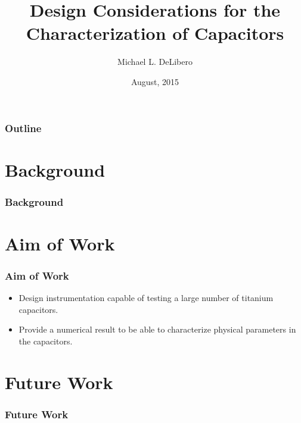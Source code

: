 \documentclass{beamer}
\title{Design Considerations for the Characterization of Capacitors}
\author{Michael L. DeLibero}
\date{August, 2015}
\institute[CWRU]{Case Western Reserve University}
\begin{document}
\begin{frame}
    \titlepage
\end{frame}



\begin{frame}
  \frametitle{Outline}
  \tableofcontents
\end{frame}

\section{Background}
\begin{frame}
    \frametitle{Background}
\end{frame}

\section{Aim of Work}
\begin{frame}
    \frametitle{Aim of Work}
    \begin{itemize}
        \item Design instrumentation capable of testing a large number of titanium capacitors.
        \item Provide a numerical result to be able to characterize physical parameters in the capacitors.
    \end{itemize}
\end{frame}




\section{Future Work}
\begin{frame}
    \frametitle{Future Work}
    
\end{frame}


\end{document}
